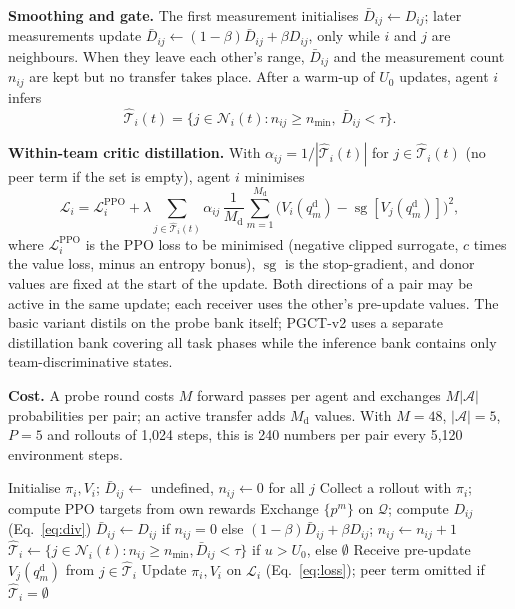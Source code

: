 \documentclass{article}
\theoremstyle{remark}
\newcommand{\sg}{\operatorname{sg}}
\newcommand{\ours}{PGCT}
\begin{document}
\textbf{Smoothing and gate.} The first measurement initialises $\bar D_{ij}\gets D_{ij}$; later measurements update
$\bar D_{ij}\gets(1-\beta)\bar D_{ij}+\beta D_{ij}$, only while $i$ and $j$ are neighbours. When they leave each other's
range, $\bar D_{ij}$ and the measurement count $n_{ij}$ are kept but no transfer takes place. After a warm-up of $U_0$ updates,
agent $i$ infers
\begin{equation}
  \hat{\mathcal{T}}_i(t)=\{j\in\mathcal{N}_i(t): n_{ij}\ge n_{\min},\ \bar D_{ij}<\tau\}.
\end{equation}

\textbf{Within-team critic distillation.} With $\alpha_{ij}=1/|\hat{\mathcal{T}}_i(t)|$ for $j\in\hat{\mathcal{T}}_i(t)$ (no peer term if the
set is empty), agent $i$ minimises
\begin{equation}
  \mathcal{L}_i=\mathcal{L}^{\mathrm{PPO}}_i+\lambda\sum_{j\in\hat{\mathcal{T}}_i(t)}\alpha_{ij}\,
  \frac{1}{M_{\mathrm{d}}}\sum_{m=1}^{M_{\mathrm{d}}}\big(V_i(q^{\mathrm{d}}_m)-\sg[V_j(q^{\mathrm{d}}_m)]\big)^2,
  \label{eq:loss}
\end{equation}
where $\mathcal{L}^{\mathrm{PPO}}_i$ is the PPO loss to be minimised (negative clipped surrogate, $c$ times the value loss,
minus an entropy bonus), $\sg$ is the stop-gradient, and donor values are fixed at the start of the update. Both directions
of a pair may be active in the same update; each receiver uses the other's pre-update values. The basic variant distils on
the probe bank itself; \ours{}-v2 uses a separate distillation bank covering all task phases while the inference bank
contains only team-discriminative states.

\textbf{Cost.} A probe round costs $M$ forward passes per agent and exchanges $M|\mathcal{A}|$ probabilities per pair; an active
transfer adds $M_{\mathrm{d}}$ values. With $M=48$, $|\mathcal{A}|=5$, $P=5$ and rollouts of 1{,}024 steps, this is 240 numbers per pair
every 5{,}120 environment steps.

\begin{algorithm}[t]
\caption{\ours{} for agent $i$}
\label{alg:pgct}
\begin{algorithmic}[1]
\State Initialise $\pi_i,V_i$; $\bar D_{ij}\gets$ undefined, $n_{ij}\gets 0$ for all $j$
  \State Collect a rollout with $\pi_i$; compute PPO targets from own rewards
      \State Exchange $\{p^m\}$ on $\mathcal{Q}$; compute $D_{ij}$ (Eq.~\ref{eq:div})
      \State $\bar D_{ij}\gets D_{ij}$ if $n_{ij}=0$ else $(1-\beta)\bar D_{ij}+\beta D_{ij}$; $n_{ij}\gets n_{ij}+1$
    \EndFor
  \EndIf
  \State $\hat{\mathcal{T}}_i\gets\{j\in\mathcal{N}_i(t):n_{ij}\ge n_{\min},\bar D_{ij}<\tau\}$ if $u>U_0$, else $\emptyset$
  \State Receive pre-update $V_j(q^{\mathrm{d}}_m)$ from $j\in\hat{\mathcal{T}}_i$
  \State Update $\pi_i,V_i$ on $\mathcal{L}_i$ (Eq.~\ref{eq:loss}); peer term omitted if $\hat{\mathcal{T}}_i=\emptyset$
\EndFor
\end{algorithmic}
\end{algorithm}
\end{document}

